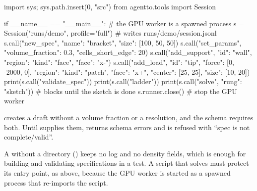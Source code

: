 \begin{pycode}
import sys; sys.path.insert(0, "src")
from agentto.tools import Session

if __name__ == "__main__":                     # the GPU worker is a spawned process
    s = Session("runs/demo", profile="full")   # writes runs/demo/session.jsonl
    s.call("new_spec", {"name": "bracket", "size": [100, 50, 50]})
    s.call("set_params", {"volume_fraction": 0.3, "cells_short_edge": 20})
    s.call("add_support", {"id": "wall", "region": {"kind": "face", "face": "x-"}})
    s.call("add_load", {"id": "tip", "force": [0, -2000, 0],
                        "region": {"kind": "patch", "face": "x+",
                                   "center": [25, 25], "size": [10, 20]}})
    print(s.call("validate_spec"))
    print(s.call("ladder"))
    print(s.call("solve", {"rung": "sketch"}))  # blocks until the sketch is done
    s.runner.close()                            # stop the GPU worker
\end{pycode}

\begin{warnbox}
 creates a draft without a volume fraction or a resolution, and the schema requires both. Until
 supplies them,  returns schema errors and  is refused with
``spec is not complete/valid''.
\end{warnbox}

A  without a directory () keeps no log and no density fields, which is enough for
building and validating specifications in a test. A script that solves must protect its entry point, as above,
because the GPU worker is started as a spawned process that re-imports the script.
